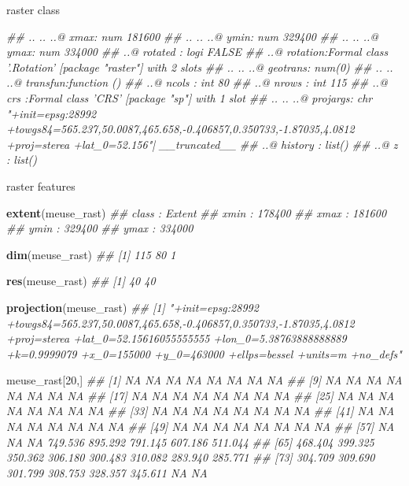 \documentclass[11pt,ignorenonframetext,]{beamer}
\newenvironment{Shaded}{}{}
\newcommand{\CommentTok}[1]{\textcolor[rgb]{0.38,0.63,0.69}{\textit{#1}}}
\newcommand{\DecValTok}[1]{\textcolor[rgb]{0.25,0.63,0.44}{#1}}
\newcommand{\KeywordTok}[1]{\textcolor[rgb]{0.00,0.44,0.13}{\textbf{#1}}}
\newcommand{\NormalTok}[1]{#1}
\let\oldShaded\Shaded
\let\endoldShaded\endShaded
\renewenvironment{Shaded}{\footnotesize\begin{spacing}{0.9}\oldShaded}{\endoldShaded\end{spacing}}
\let\oldverbatim\verbatim
\let\endoldverbatim\endverbatim
\newcommand{\scriptoutput}{
  \renewenvironment{Shaded}{\scriptsize\begin{spacing}{0.9}\oldShaded}{\endoldShaded\end{spacing}}
  \renewenvironment{verbatim}{\scriptsize\begin{spacing}{0.9}\oldverbatim}{\endoldverbatim\end{spacing}}
}
\begin{document}
\begin{frame}[fragile]{raster class}
\begin{Shaded}
\begin{Highlighting}[]
\CommentTok{##   .. .. ..@ xmax: num 181600}
\CommentTok{##   .. .. ..@ ymin: num 329400}
\CommentTok{##   .. .. ..@ ymax: num 334000}
\CommentTok{##   ..@ rotated : logi FALSE}
\CommentTok{##   ..@ rotation:Formal class '.Rotation' [package "raster"] with 2 slots}
\CommentTok{##   .. .. ..@ geotrans: num(0) }
\CommentTok{##   .. .. ..@ transfun:function ()  }
\CommentTok{##   ..@ ncols   : int 80}
\CommentTok{##   ..@ nrows   : int 115}
\CommentTok{##   ..@ crs     :Formal class 'CRS' [package "sp"] with 1 slot}
\CommentTok{##   .. .. ..@ projargs: chr "+init=epsg:28992 +towgs84=565.237,50.0087,465.658,-0.406857,0.350733,-1.87035,4.0812 +proj=sterea +lat_0=52.156"| __truncated__}
\CommentTok{##   ..@ history : list()}
\CommentTok{##   ..@ z       : list()}
\end{Highlighting}
\end{Shaded}

\end{frame}

\begin{frame}[fragile,t]{raster features}
\protect\hypertarget{raster-features}{}

\scriptoutput

\begin{Shaded}
\begin{Highlighting}[]
\KeywordTok{extent}\NormalTok{(meuse_rast)}
\CommentTok{## class       : Extent }
\CommentTok{## xmin        : 178400 }
\CommentTok{## xmax        : 181600 }
\CommentTok{## ymin        : 329400 }
\CommentTok{## ymax        : 334000}

\KeywordTok{dim}\NormalTok{(meuse_rast)}
\CommentTok{## [1] 115  80   1}

\KeywordTok{res}\NormalTok{(meuse_rast)}
\CommentTok{## [1] 40 40}

\KeywordTok{projection}\NormalTok{(meuse_rast)}
\CommentTok{## [1] "+init=epsg:28992 +towgs84=565.237,50.0087,465.658,-0.406857,0.350733,-1.87035,4.0812 +proj=sterea +lat_0=52.15616055555555 +lon_0=5.38763888888889 +k=0.9999079 +x_0=155000 +y_0=463000 +ellps=bessel +units=m +no_defs"}

\NormalTok{meuse_rast[}\DecValTok{20}\NormalTok{,]}
\CommentTok{##  [1]      NA      NA      NA      NA      NA      NA      NA      NA}
\CommentTok{##  [9]      NA      NA      NA      NA      NA      NA      NA      NA}
\CommentTok{## [17]      NA      NA      NA      NA      NA      NA      NA      NA}
\CommentTok{## [25]      NA      NA      NA      NA      NA      NA      NA      NA}
\CommentTok{## [33]      NA      NA      NA      NA      NA      NA      NA      NA}
\CommentTok{## [41]      NA      NA      NA      NA      NA      NA      NA      NA}
\CommentTok{## [49]      NA      NA      NA      NA      NA      NA      NA      NA}
\CommentTok{## [57]      NA      NA      NA 749.536 895.292 791.145 607.186 511.044}
\CommentTok{## [65] 468.404 399.325 350.362 306.180 300.483 310.082 283.940 285.771}
\CommentTok{## [73] 304.709 309.690 301.799 308.753 328.357 345.611      NA      NA}
\end{Highlighting}
\end{Shaded}

\end{frame}
\end{document}
